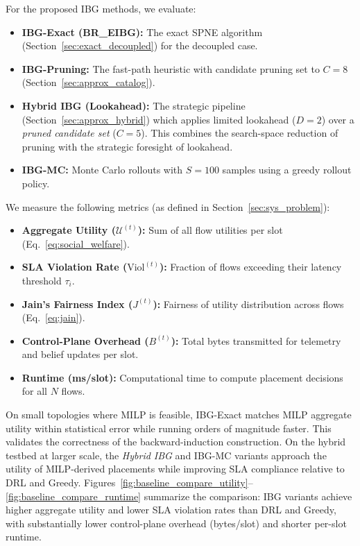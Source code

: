 \documentclass[journal]{IEEEtran}
\theoremstyle{plain}
\theoremstyle{definition}
\theoremstyle{remark}
\begin{document}
For the proposed IBG methods, we evaluate:
\begin{itemize}
    \item \textbf{IBG-Exact (BR\_EIBG):} The exact SPNE algorithm (Section~\ref{sec:exact_decoupled}) for the decoupled case.
    \item \textbf{IBG-Pruning:} The fast-path heuristic with candidate pruning set to $C=8$ (Section~\ref{sec:approx_catalog}).
    \item \textbf{Hybrid IBG (Lookahead):} The strategic pipeline (Section~\ref{sec:approx_hybrid}) which applies limited lookahead ($D=2$) over a \textit{pruned candidate set} ($C=5$). This combines the search-space reduction of pruning with the strategic foresight of lookahead.
    \item \textbf{IBG-MC:} Monte Carlo rollouts with $S=100$ samples using a greedy rollout policy.
\end{itemize}

We measure the following metrics (as defined in Section~\ref{sec:sys_problem}):

\begin{itemize}
    \item \textbf{Aggregate Utility ($\mathcal{U}^{(t)}$):} Sum of all flow utilities per slot (Eq.~\eqref{eq:social_welfare}).
    \item \textbf{SLA Violation Rate ($\mathrm{Viol}^{(t)}$):} Fraction of flows exceeding their latency threshold $\tau_i$.
    \item \textbf{Jain's Fairness Index ($J^{(t)}$):} Fairness of utility distribution across flows (Eq.~\eqref{eq:jain}).
    \item \textbf{Control-Plane Overhead ($B^{(t)}$):} Total bytes transmitted for telemetry and belief updates per slot.
    \item \textbf{Runtime (ms/slot):} Computational time to compute placement decisions for all $N$ flows.
\end{itemize}

On small topologies where MILP is feasible, IBG-Exact matches MILP aggregate utility within statistical error while running orders of magnitude faster. This validates the correctness of the backward-induction construction. On the hybrid testbed at larger scale, the \textit{Hybrid IBG} and IBG-MC variants approach the utility of MILP-derived placements while improving SLA compliance relative to DRL and Greedy. Figures~\ref{fig:baseline_compare_utility}–\ref{fig:baseline_compare_runtime} summarize the comparison: IBG variants achieve higher aggregate utility and lower SLA violation rates than DRL and Greedy, with substantially lower control-plane overhead (bytes/slot) and shorter per-slot runtime.
\end{document}

